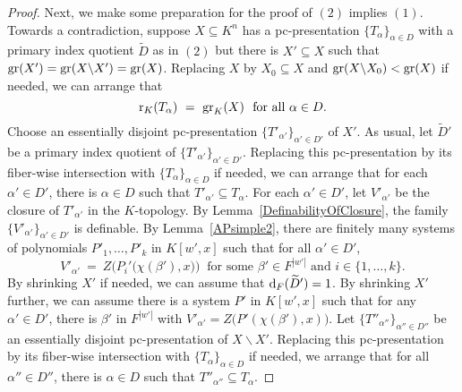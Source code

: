 \begin{proof}
Next, we make some preparation for the proof of $(2)$ implies $(1)$. 
Towards a contradiction, suppose $X \subseteq K^n$ has a pc-presentation $\{ T_\alpha\}_{ \alpha \in D}$ with a primary index quotient $\widetilde{D}$ as in $(2)$ but there is $X'\subseteq X$ such that $\mathrm{gr}(X')= \mathrm{gr}(X \backslash X') = \mathrm{gr}(X)$.
Replacing $X$ by $X_0 \subseteq X$ and $\mathrm{gr}(X \backslash X_0)< \mathrm{gr}(X)$ if needed, we can arrange that  $$\mathrm{r}_K(T_\alpha)\ =\ \mathrm{gr}_K(X)\ \text{ for all } \alpha \in D.$$ 
Choose an essentially disjoint pc-presentation $\{ {T'}_{\alpha'}\}_{ \alpha' \in D'}$ of $X'$. As usual, let $\widetilde{D}'$ be a primary index quotient of  $\{ {T'}_{\alpha'}\}_{ \alpha' \in D'}$. 
Replacing this pc-presentation by its fiber-wise intersection with $\{ T_\alpha\}_{ \alpha \in D}$ if needed,  we can arrange that for each $\alpha' \in D'$, there is $\alpha \in D$ such that ${T'}_{\alpha'} \subseteq T_\alpha$.
For each $\alpha' \in D'$, let $V'_{\alpha'}$ be the closure of ${T'}_{\alpha'}$ in the $K$-topology.
By Lemma~\ref{DefinabilityOfClosure}, the family $\{ V'_{\alpha'} \}_{\alpha' \in D'}$ is definable. By Lemma~\ref{APsimple2}, there are finitely many systems of polynomials $P'_1, \ldots, P'_k$ in $K[w', x]$ such that for all $\alpha' \in D'$, 
$$ V'_{\alpha'}\ =\ Z\Big(P_i'\big(\chi(\beta'),x\big)\Big)\ \text{ for some } \beta' \in F^{|w'|} \text{ and } i \in \{1, \ldots, k\}.$$ 
By shrinking $X'$ if needed, we can assume that $\mathrm{d}_F(\widetilde{D}') =1$. 
By shrinking $X'$ further, we can assume there is  a system $P'$ in $K[w', x]$ such that for any $\alpha' \in D'$, there is $\beta'$ in $F^{|w'|}$ with $ V'_{\alpha'} =Z\big(P'(\chi(\beta'),x)\big)$. 
Let $\{ {T''}_{\alpha''}\}_{ \alpha'' \in D''}$ be an essentially disjoint pc-presentation of $X \backslash X'$. Replacing this pc-presentation by its fiber-wise intersection with $\{ T_\alpha\}_{ \alpha \in D}$ if needed,  we arrange that  for all $\alpha'' \in D''$, there is $\alpha \in D$ such that ${T''}_{\alpha''} \subseteq T_\alpha$. 



\end{proof}
